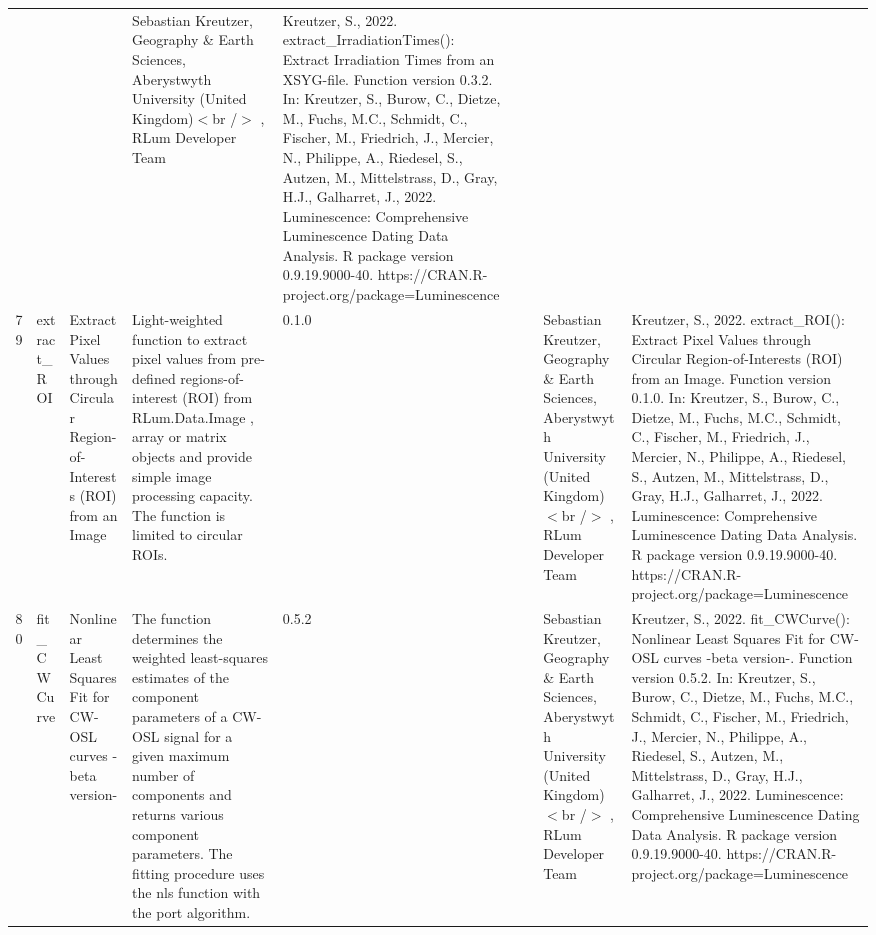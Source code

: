 \begin{table}[ht]
\begin{tabular}{rllllllll}
 &  &  & Sebastian Kreutzer, Geography \& Earth Sciences, Aberystwyth University (United Kingdom)$<$br /$>$ , RLum Developer Team & Kreutzer, S., 2022. extract\_IrradiationTimes(): Extract Irradiation Times from an XSYG-file. Function version 0.3.2. In: Kreutzer, S., Burow, C., Dietze, M., Fuchs, M.C., Schmidt, C., Fischer, M., Friedrich, J., Mercier, N., Philippe, A., Riedesel, S., Autzen, M., Mittelstrass, D., Gray, H.J., Galharret, J., 2022. Luminescence: Comprehensive Luminescence Dating Data Analysis. R package version 0.9.19.9000-40. https://CRAN.R-project.org/package=Luminescence
 \\ 
  79 & extract\_ROI & Extract Pixel Values through Circular Region-of-Interests (ROI) from an Image & Light-weighted function to extract pixel values from pre-defined regions-of-interest (ROI) from RLum.Data.Image ,  array  or  matrix  objects and provide simple image processing capacity. The function is limited to circular ROIs. & 0.1.0
 &  &  & Sebastian Kreutzer, Geography \& Earth Sciences, Aberystwyth University (United Kingdom)$<$br /$>$ , RLum Developer Team & Kreutzer, S., 2022. extract\_ROI(): Extract Pixel Values through Circular Region-of-Interests (ROI) from an Image. Function version 0.1.0. In: Kreutzer, S., Burow, C., Dietze, M., Fuchs, M.C., Schmidt, C., Fischer, M., Friedrich, J., Mercier, N., Philippe, A., Riedesel, S., Autzen, M., Mittelstrass, D., Gray, H.J., Galharret, J., 2022. Luminescence: Comprehensive Luminescence Dating Data Analysis. R package version 0.9.19.9000-40. https://CRAN.R-project.org/package=Luminescence
 \\ 
  80 & fit\_CWCurve & Nonlinear Least Squares Fit for CW-OSL curves -beta version- & The function determines the weighted least-squares estimates of the component parameters of a CW-OSL signal for a given maximum number of components and returns various component parameters. The fitting procedure uses the  nls  function with the  port  algorithm. & 0.5.2
 &  &  & Sebastian Kreutzer, Geography \& Earth Sciences, Aberystwyth University (United Kingdom)$<$br /$>$ , RLum Developer Team & Kreutzer, S., 2022. fit\_CWCurve(): Nonlinear Least Squares Fit for CW-OSL curves -beta version-. Function version 0.5.2. In: Kreutzer, S., Burow, C., Dietze, M., Fuchs, M.C., Schmidt, C., Fischer, M., Friedrich, J., Mercier, N., Philippe, A., Riedesel, S., Autzen, M., Mittelstrass, D., Gray, H.J., Galharret, J., 2022. Luminescence: Comprehensive Luminescence Dating Data Analysis. R package version 0.9.19.9000-40. https://CRAN.R-project.org/package=Luminescence
 \\ 

\end{tabular}
\end{table}
